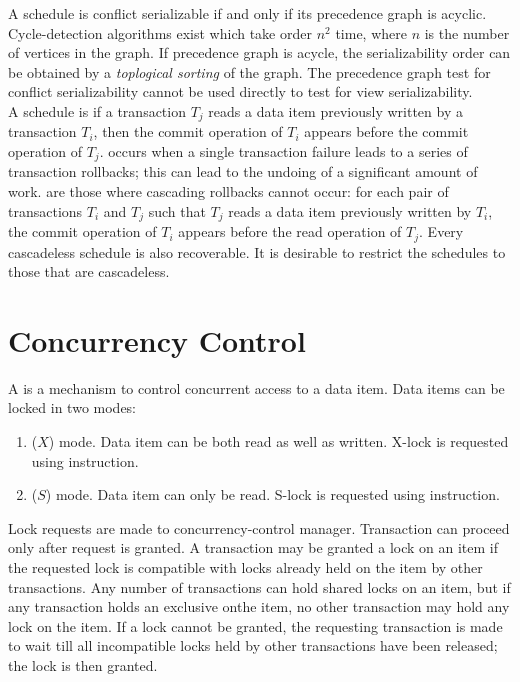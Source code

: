 \documentclass{article}
\begin{document}
A schedule is conflict serializable if and only if its precedence graph is acyclic. Cycle-detection algorithms exist which take order $n^2$ time, where $n$ is the number of vertices in the graph. If precedence graph is acycle, the serializability order can be obtained by a \emph{toplogical sorting} of the graph. The precedence graph test for conflict serializability cannot be used directly to test for view serializability. \\ 

A schedule is  if a transaction $T_j$ reads a data item previously written by a transaction $T_i$, then the commit operation of $T_i$ appears before the commit operation of $T_j$.  occurs when a single transaction failure leads to a series of transaction rollbacks; this can lead to the undoing of a significant amount of work.  are those where cascading rollbacks cannot occur: for each pair of transactions $T_i$ and $T_j$ such that $T_j$ reads a data item previously written by $T_i$, the commit operation of $T_i$ appears before the read operation of $T_j$. Every cascadeless schedule is also recoverable. It is desirable to restrict the schedules to those that are cascadeless. 

\section{Concurrency Control}

A  is a mechanism to control concurrent access to a data item. Data items can be locked in two modes: 
\begin{enumerate}
  \item {} ($X$) mode. Data item can be both read as well as written. X-lock is requested using  instruction. 
  \item {} ($S$) mode. Data item can only be read. S-lock is requested using  instruction.
\end{enumerate}

Lock requests are made to concurrency-control manager. Transaction can proceed only after request is granted. A transaction may be granted a lock on an item if the requested lock is compatible with locks already held on the item by other transactions. Any number of transactions can hold shared locks on an item, but if any transaction holds an exclusive onthe item, no other transaction may hold any lock on the item. If a lock cannot be granted, the requesting transaction is made to wait till all incompatible locks held by other transactions have been released; the lock is then granted. \\ 
\end{document}
